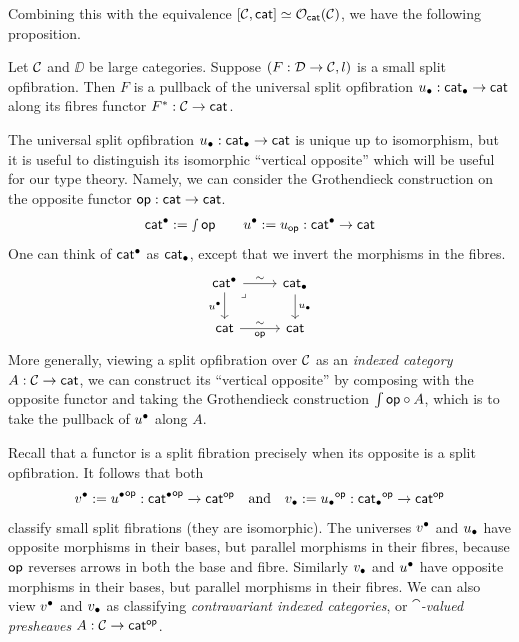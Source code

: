 Combining this with the equivalence
$[\mathcal{C},\mathsf{cat}] \simeq {\mathcal{O}}_{\mathsf{cat}}(\mathcal{C})$,
we have the following proposition.
\begin{proposition}\label{prop:universal-opfibration-classifies}
  Let $\mathcal{C}$ and $\DD$ be large categories.
  Suppose $(F : \mathcal{D} \to \mathcal{C}, l)$ is a small split opfibration.
  Then $F$ is a pullback of the universal split opfibration
  ${u_\bullet} : \mathsf{cat}_\bullet \to \mathsf{cat}$ along its fibres functor
  $F^* : \mathcal{C} \to \mathsf{cat}$.
\end{proposition}

The universal split opfibration
${u_\bullet} : \mathsf{cat}_\bullet \to \mathsf{cat}$ is unique up to isomorphism,
but it is useful to distinguish its isomorphic ``vertical opposite''
which will be useful for our type theory.
Namely, we can consider the Grothendieck construction
on the opposite functor $\mathsf{op} : \mathsf{cat} \to \mathsf{cat}$.
\[ \mathsf{cat}^\bullet := \smallint \mathsf{op} 
  \quad \quad {u^{\bullet}} := u_{\mathsf{op}{}} : \mathsf{cat}^\bullet \to \mathsf{cat} \]
One can think of $\mathsf{cat}^\bullet$ as $\mathsf{cat}_\bullet$,
except that we invert the
morphisms in the fibres.
\[\begin{tikzcd}
    \catp & \pcat \\
    \cat & \cat
    \arrow["\sim", from=1-1, to=1-2]
    \arrow["{\uupp}"', from=1-1, to=2-1]
    \arrow["\lrcorner"{anchor=center, pos=0.125}, draw=none, from=1-1, to=2-2]
    \arrow["{\ulow}", from=1-2, to=2-2]
    \arrow["\op{}"', from=2-1, to=2-2]
    \arrow["\sim", draw=none, from=2-1, to=2-2]
  \end{tikzcd} \]
More generally, viewing a split opfibration over $\mathcal{C}$
as an \emph{indexed category} $A : \mathcal{C} \to \mathsf{cat}$,
we can construct its ``vertical opposite'' by composing with the opposite functor
and taking the Grothendieck construction
$\int \mathsf{op}{} \circ A$,
which is to take the pullback of ${u^{\bullet}}$ along $A$.

Recall that a functor is a split fibration precisely when
its opposite is a split opfibration.
It follows that both
\[{v^\bullet} := {{u^{\bullet}}}^{\mathsf{op}} : {\mathsf{cat}^\bullet}^{\mathsf{op}} \to {\mathsf{cat}}^{\mathsf{op}}
\quad \text{and} \quad
{v_\bullet} := {{u_\bullet}}^{\mathsf{op}} : {\mathsf{cat}_\bullet}^{\mathsf{op}} \to {\mathsf{cat}}^{\mathsf{op}}
\]
classify small split fibrations (they are isomorphic).
The universes ${v^\bullet}$ and ${u_\bullet}$ have opposite morphisms in their bases,
but parallel morphisms in their fibres,
because $\mathsf{op}$ reverses arrows in both the base and fibre.
Similarly ${v_\bullet}$ and ${u^{\bullet}}$ have opposite morphisms in their bases,
but parallel morphisms in their fibres.
We can also view ${v^\bullet}$ and ${v_\bullet}$ as classifying
\emph{contravariant indexed categories},
or \emph{$\cat$-valued presheaves} $A : \mathcal{C} \to \mathsf{cat}^{\mathsf{op}}$.

